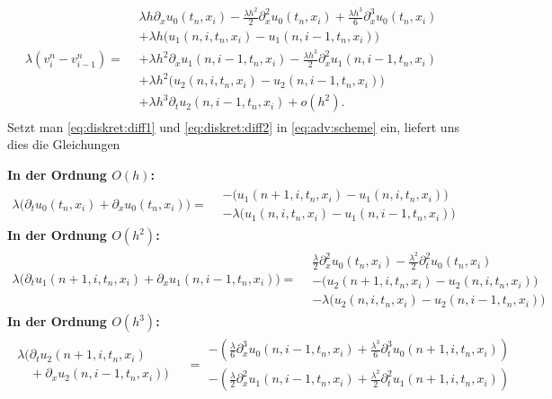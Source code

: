 { 
\begin{align} \label{eq:diskret:diff2}
\lambda (v^n_i - v^n_{i-1}) =
\begin{split}
&\lambda h \partial_x u_0(t_n, x_i) - \frac {\lambda h^2}{2} \partial^2_x u_0(t_n, x_i) + \frac {\lambda h^3}{6} \partial^3_x u_0(t_n, x_i)\\
&+ \lambda h \bigl( u_1(n, i, t_n, x_i) - u_1(n, i-1, t_n, x_i) \bigr)\\
&+ \lambda h^2 \partial_x u_1(n, i-1, t_n, x_i) - \frac {\lambda h^3}{2} \partial^2_x u_1(n, i-1, t_n, x_i)\\
&+ \lambda h^2 \bigl( u_2(n, i, t_n, x_i) - u_2(n, i-1, t_n, x_i) \bigr)\\
&+ \lambda h^3 \partial_t u_2(n, i-1, t_n, x_i) + o(h^2).
\end{split}
\end{align}
}
\noindent
Setzt man \eqref{eq:diskret:diff1} und \eqref{eq:diskret:diff2} in \eqref{eq:adv:scheme} ein, liefert uns dies die Gleichungen

\vspace{0.4cm}
\noindent \textbf{In der Ordnung $O(h)$:}
\begin{align}\label{eq:diskret:oh}
\lambda \bigl( \partial_t u_0(t_n, x_i) + \partial_x u_0(t_n, x_i) \bigr) =
\begin{split}
&- \bigl( u_1(n+1, i, t_n, x_i) - u_1(n, i, t_n, x_i) \bigr)\\
&- \lambda \bigl(u_1(n, i, t_n, x_i) - u_1(n, i-1, t_n, x_i) \bigr)
\end{split}
\end{align}
\vspace{0.4cm}
\noindent \textbf{In der Ordnung $O(h^2)$:}
\begin{align}\label{eq:diskret:oh2}
\lambda \bigl( \partial_t u_1(n+1, i, t_n, x_i) + \partial_x u_1(n, i-1, t_n, x_i) \bigr) =
\begin{split}
&\frac {\lambda}{2} \partial^2_x u_0(t_n, x_i) - \frac{\lambda^2}{2} \partial^2_t u_0(t_n, x_i)\\
&- \bigl( u_2(n+1, i, t_n, x_i) - u_2(n, i, t_n, x_i) \bigr)\\
&- \lambda \bigl(u_2(n, i, t_n, x_i) - u_2(n, i-1, t_n, x_i) \bigr)
\end{split}
\end{align}
\vspace{0.4cm}
\noindent \textbf{In der Ordnung $O(h^3)$:}
\begin{align}\label{eq:diskret:oh3}
\begin{split}
\lambda \bigl(\partial_t u_2(n+1, i, t_n, x_i)\qquad\\
\quad + \partial_x u_2(n, i-1, t_n, x_i) \bigr)
\end{split}
&= \begin{split}
- \left(\frac {\lambda}{6} \partial^3_x u_0(n, i-1, t_n, x_i) + \frac{\lambda^3}{6} \partial^3_t u_0(n+1, i, t_n, x_i)\right)\\
- \left(\frac {\lambda}{2} \partial^2_x u_1(n, i-1, t_n, x_i) + \frac{\lambda^2}{2} \partial^2_t u_1(n+1, i, t_n, x_i)\right)
\end{split}
\end{align}

